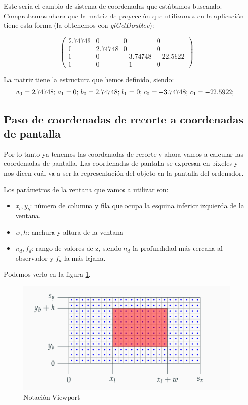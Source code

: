 \documentclass[a4paper,11pt, oneside]{book}
\begin{document}
Este sería el cambio de sistema de coordenadas que estábamos buscando. Comprobamos ahora que la matriz de proyección que utilizamos en la aplicación tiene esta forma (la obtenemos con \textit{glGetDoublev}):

$$\begin{pmatrix}
2.74748 & 0&0&0\\
0&2.74748 &0&0\\
0&0&-3.74748&-22.5922\\
0&0&-1&0
\end{pmatrix}$$

La matriz tiene la estructura que hemos definido, siendo:
$$a_0 = 2.74748\textup{;  }
a_1 = 0\textup{;  }
b_0 = 2.74748\textup{;  }
b_1 = 0\textup{;  }
c_0 = -3.74748\textup{;  }
c_1 = -22.5922\textup{;  }
$$

\subsection{Paso de coordenadas de recorte a coordenadas de pantalla}
Por lo tanto ya tenemos las coordenadas de recorte y ahora vamos a calcular las coordenadas de pantalla. Las coordenadas de pantalla se expresan en píxeles y nos dicen cuál va a ser la representación del objeto en la pantalla del ordenador.

Los parámetros de la ventana que vamos a utilizar son:
\begin{itemize}
	\item $x_l, y_b$: número de columna y fila que ocupa la esquina inferior izquierda de la ventana.
	\item $w,h$: anchura y altura de la ventana
	\item $n_d, f_d$: rango de valores de z, siendo $n_d$ la profundidad más cercana al observador y $f_d$ la más lejana.
\end{itemize}
Podemos verlo en la figura \ref{fig:viewport}.
\begin{figure}[H]
	
	\centering
	\includegraphics[width=\linewidth]{viewport}
	\caption{Notación Viewport \cite{informatica-grafica}}
	\label{fig:viewport}
	
\end{figure}
\end{document}
